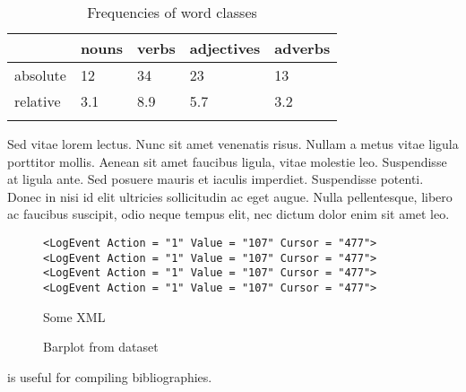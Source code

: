 \begin{table}
\caption{Frequencies of word classes}
\label{tab:1:frequencies}
 \begin{tabular}{lllll} %
  \lsptoprule
            & nouns & verbs & adjectives & adverbs\\ %
  \midrule
  absolute  &   12 &    34  &    23     & 13\\
  relative  &   3.1 &   8.9 &    5.7    & 3.2\\
  \lspbottomrule
 \end{tabular}
\end{table}


Sed vitae lorem lectus. Nunc sit amet venenatis risus. Nullam a metus vitae ligula porttitor mollis. Aenean sit amet faucibus ligula, vitae molestie leo. Suspendisse at ligula ante. Sed posuere mauris et iaculis imperdiet. Suspendisse potenti. Donec in nisi id elit ultricies sollicitudin ac eget augue. Nulla pellentesque, libero ac faucibus suscipit, odio neque tempus elit, nec dictum dolor enim sit amet leo. 

\begin{figure}
\caption{Some XML}
\begin{lstlisting}
<LogEvent Action = "1" Value = "107" Cursor = "477">
<LogEvent Action = "1" Value = "107" Cursor = "477">
<LogEvent Action = "1" Value = "107" Cursor = "477">
<LogEvent Action = "1" Value = "107" Cursor = "477">
\end{lstlisting}
\end{figure}

\begin{figure} 
  \caption{Barplot from dataset}
\end{figure}

 
\citet{Nordhoff2018} is useful for compiling bibliographies.
